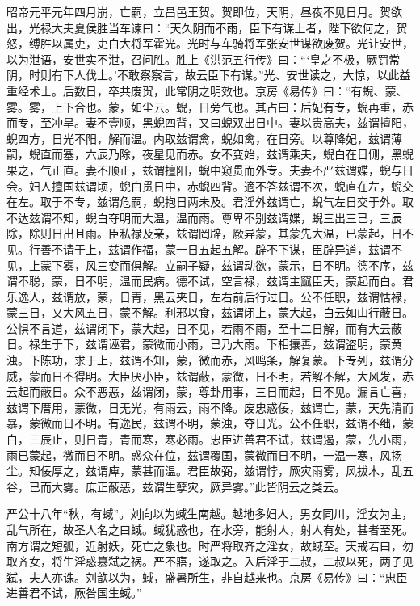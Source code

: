 \documentclass[12pt,UTF8]{ctexbook}
\begin{document}
昭帝元平元年四月崩，亡嗣，立昌邑王贺。贺即位，天阴，昼夜不见日月。贺欲出，光禄大夫夏侯胜当车谏曰：“天久阴而不雨，臣下有谋上者，陛下欲何之，贺怒，缚胜以属吏，吏白大将军霍光。光时与车骑将军张安世谋欲废贺。光让安世，以为泄语，安世实不泄，召问胜。胜上《洪范五行传》曰：“‘皇之不极，厥罚常阴，时则有下人伐上。’不敢察察言，故云臣下有谋。”光、安世读之，大惊，以此益重经术士。后数日，卒共废贺，此常阴之明效也。京房《易传》曰：“有蜺、蒙、雾。雾，上下合也。蒙，如尘云。蜺，日旁气也。其占曰：后妃有专，蜺再重，赤而专，至冲旱。妻不壹顺，黑蜺四背，又曰蜺双出日中。妻以贵高夫，兹谓擅阳，蜺四方，日光不阳，解而温。内取兹谓禽，蜺如禽，在日旁。以尊降妃，兹谓薄嗣，蜺直而塞，六辰乃除，夜星见而赤。女不变始，兹谓乘夫，蜺白在日侧，黑蜺果之，气正直。妻不顺正，兹谓擅阳，蜺中窥贯而外专。夫妻不严兹谓媟，蜺与日会。妇人擅国兹谓顷，蜺白贯日中，赤蜺四背。適不答兹谓不次，蜺直在左，蜺交在左。取于不专，兹谓危嗣，蜺抱日两未及。君淫外兹谓亡，蜺气左日交于外。取不达兹谓不知，蜺白夺明而大温，温而雨。尊卑不别兹谓媟，蜺三出三已，三辰除，除则日出且雨。臣私禄及亲，兹谓罔辟，厥异蒙，其蒙先大温，已蒙起，日不见。行善不请于上，兹谓作福，蒙一日五起五解。辟不下谋，臣辟异道，兹谓不见，上蒙下雾，风三变而俱解。立嗣子疑，兹谓动欲，蒙示，日不明。德不序，兹谓不聪，蒙，日不明，温而民病。德不试，空言禄，兹谓主窳臣夭，蒙起而白。君乐逸人，兹谓放，蒙，日青，黑云夹日，左右前后行过日。公不任职，兹谓怙禄，蒙三日，又大风五日，蒙不解。利邪以食，兹谓闭上，蒙大起，白云如山行蔽日。公惧不言道，兹谓闭下，蒙大起，日不见，若雨不雨，至十二日解，而有大云蔽日。禄生于下，兹谓诬君，蒙微而小雨，已乃大雨。下相攘善，兹谓盗明，蒙黄浊。下陈功，求于上，兹谓不知，蒙，微而赤，风鸣条，解复蒙。下专列，兹谓分威，蒙而日不得明。大臣厌小臣，兹谓蔽，蒙微，日不明，若解不解，大风发，赤云起而蔽日。众不恶恶，兹谓闭，蒙，尊卦用事，三日而起，日不见。漏言亡喜，兹谓下厝用，蒙微，日无光，有雨云，雨不降。废忠惑佞，兹谓亡，蒙，天先清而暴，蒙微而日不明。有逸民，兹谓不明，蒙浊，夺日光。公不任职，兹谓不绌，蒙白，三辰止，则日青，青而寒，寒必雨。忠臣进善君不试，兹谓遏，蒙，先小雨，雨已蒙起，微而日不明。惑众在位，兹谓覆国，蒙微而日不明，一温一寒，风扬尘。知佞厚之，兹谓庳，蒙甚而温。君臣故弼，兹谓悖，厥灾雨雾，风拔木，乱五谷，已而大雾。庶正蔽恶，兹谓生孽灾，厥异雾。”此皆阴云之类云。



严公十八年“秋，有蜮”。刘向以为蜮生南越。越地多妇人，男女同川，淫女为主，乱气所在，故圣人名之曰蜮。蜮犹惑也，在水旁，能射人，射人有处，甚者至死。南方谓之短弧，近射妖，死亡之象也。时严将取齐之淫女，故蜮至。天戒若曰，勿取齐女，将生淫惑篡弑之祸。严不寤，遂取之。入后淫于二叔，二叔以死，两子见弑，夫人亦诛。刘歆以为，蜮，盛暑所生，非自越来也。京房《易传》曰：“忠臣进善君不试，厥咎国生蜮。”
\end{document}
